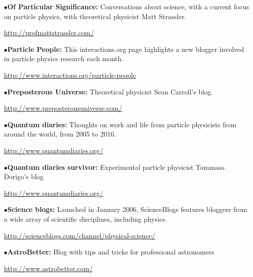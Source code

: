 \medskip

\item{$\bullet$}{\bf Of Particular Significance:}
Conversations about science, with a current focus on particle physics, with theoretical physicist Matt Strassler.
	\item{}\qquad\url{http://profmattstrassler.com/}

\medskip

\item{$\bullet$}{\bf Particle People:} 
This interactions.org page highlights a new blogger involved in particle physics research each month.
	\item{}\qquad\url{http://www.interactions.org/particle-people}

\medskip

\item{$\bullet$}{\bf Preposterous Universe:}
Theoretical physicist Sean Carroll's blog.
	\item{}\qquad\url{http://www.preposterousuniverse.com/}

\medskip

\item{$\bullet$}{\bf Quantum diaries:}
Thoughts on work and life from particle physicists from around the world, from 2005 to 2016. 
	\item{}\qquad\url{http://www.quantumdiaries.org/}


\medskip

\item{$\bullet$}{\bf Quantum diaries survivor:}
Experimental particle physicist Tommaso Dorigo’s blog 
	\item{}\qquad\url{http://www.quantumdiaries.org/}

\medskip

\item{$\bullet$}{\bf Science blogs:} 
Launched in January 2006, ScienceBlogs features bloggers from a wide array of scientific disciplines, including physics.
	\item{}\qquad\url{http://scienceblogs.com/channel/physical-science/}

\medskip

\item{$\bullet$}{\bf AstroBetter:} 
Blog with tips and tricks for professional astronomers
	\item{}\qquad\url{http://www.astrobetter.com/}


\medskip


\endRPPonly



